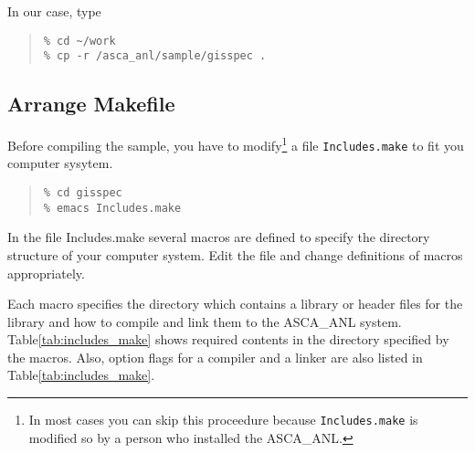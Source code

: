 In our case, type
\begin{quote}\baselineskip 3.2mm\begin{verbatim}
% cd ~/work
% cp -r /asca_anl/sample/gisspec .
\end{verbatim}\end{quote}

\subsection{Arrange Makefile}
Before compiling the sample,
you have to modify\footnote{
In most cases you can skip this proceedure
because {\tt Includes.make} is modified so
by a person who installed the ASCA\_ANL.
}
a file {\tt Includes.make} to fit you computer sysytem.

\begin{quote}\baselineskip 3.2mm\begin{verbatim}
% cd gisspec
% emacs Includes.make
\end{verbatim}\end{quote}

In the file Includes.make
several macros are defined
to specify the directory structure of your computer system.
Edit the file
and change definitions of macros appropriately.

Each macro specifies the directory
which contains a library or header files for the library
and how to compile and link them to the ASCA\_ANL system.
Table\ref{tab:includes_make} shows
required contents in the directory specified by the macros.
Also,
option flags for a compiler and a linker
are also listed in Table\ref{tab:includes_make}.

